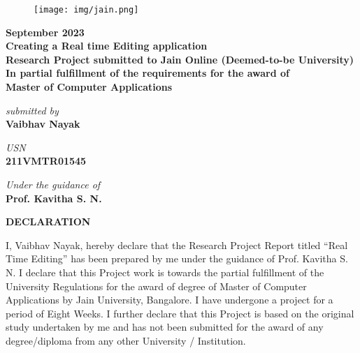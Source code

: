 \documentclass{article}
\begin{document}
\begin{center}
    
\begin{figure}[t]
    \centering
    \texttt{[image: img/jain.png]}
\end{figure}
\Large\bfseries September 2023 \\
\vspace{10pt}
\Large\bfseries Creating a Real time Editing application \\
\vspace{30pt}
\normalsize\bfseries Research Project submitted to Jain Online (Deemed-to-be University) 
In partial fulfillment of the requirements for the award of \\
\vspace{30pt}
\Large\bfseries Master of Computer Applications \\
\vspace{30pt}

{\itshape submitted by} \\
\vspace{10pt}
\Large\bfseries Vaibhav Nayak \\
\vspace{30pt}

{\itshape USN }\\
\vspace{10pt}
\Large\bfseries 211VMTR01545 \\
\vspace{30pt}

{\itshape Under the guidance of} \\
\vspace{10pt}
\Large\bfseries Prof. Kavitha S. N.\\

\end{center}


\newpage
\begin{center}
    \LARGE\bfseries DECLARATION \\
\end{center}

\vspace{25pt}

{\large I, Vaibhav Nayak, hereby declare that the Research Project Report titled “Real Time Editing” has been prepared by me under the guidance of Prof. Kavitha S. N. I declare that this Project work is towards the partial fulfillment of the University Regulations for the award of degree of Master of Computer Applications by Jain University, Bangalore. I have undergone a project for a period of Eight Weeks. I further declare that this Project is based on the original study undertaken by me and has not been submitted for the award of any degree/diploma from any other University / Institution.}
\end{document}
